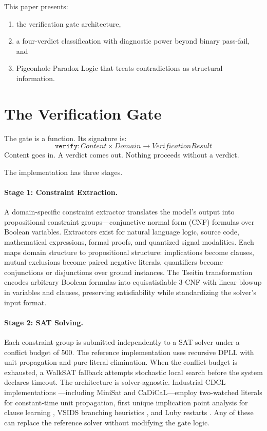\documentclass[11pt,a4paper]{article}
\begin{document}
This paper presents:
\begin{enumerate}[nosep]
    \item the verification gate architecture,
    \item a four-verdict classification with diagnostic power beyond binary pass-fail, and
    \item Pigeonhole Paradox Logic that treats contradictions as structural information.
\end{enumerate}

\section{The Verification Gate}

The gate is a function.
Its signature is:
\[
\texttt{verify} : \textit{Content} \times \textit{Domain} \to \textit{VerificationResult}
\]
Content goes in.
A verdict comes out.
Nothing proceeds without a verdict.

The implementation has three stages.

\paragraph{Stage 1: Constraint Extraction.}
A domain-specific constraint extractor translates the model's output into propositional constraint groups---conjunctive normal form (CNF) formulas over Boolean variables.
Extractors exist for natural language logic, source code, mathematical expressions, formal proofs, and quantized signal modalities.
Each maps domain structure to propositional structure: implications become clauses, mutual exclusions become paired negative literals, quantifiers become conjunctions or disjunctions over ground instances.
The Tseitin transformation \citep{tseitin1968} encodes arbitrary Boolean formulas into equisatisfiable 3-CNF with linear blowup in variables and clauses, preserving satisfiability while standardizing the solver's input format.

\paragraph{Stage 2: SAT Solving.}
Each constraint group is submitted independently to a SAT solver under a conflict budget of 500.
The reference implementation uses recursive DPLL \citep{davis1962} with unit propagation and pure literal elimination.
When the conflict budget is exhausted, a WalkSAT fallback \citep{selman1994} attempts stochastic local search before the system declares timeout.
The architecture is solver-agnostic.
Industrial CDCL implementations \citep{silva1996, biere2009}---including MiniSat \citep{een2003} and CaDiCaL---employ two-watched literals for constant-time unit propagation, first unique implication point analysis for clause learning \citep{zhang2001}, VSIDS branching heuristics \citep{moskewicz2001}, and Luby restarts \citep{luby1993}.
Any of these can replace the reference solver without modifying the gate logic.
\end{document}
